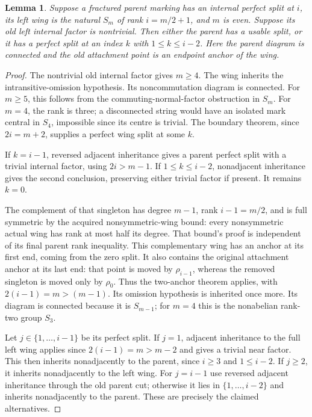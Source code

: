 \documentclass[11pt,a4paper]{article}
\newtheorem{lemma}{Lemma}
\begin{document}
\begin{lemma}\label{move}
Suppose a fractured parent marking has an internal perfect split at $i$,
its left wing is the natural $S_m$ of rank $i=m/2+1$,
and $m$ is even. Suppose its old left internal factor is nontrivial. Then either the parent has a usable split, or
it has a perfect split at an index $k$ with $1\le k\le i-2$.
Here the parent diagram is connected and the old attachment point
is an endpoint anchor of the wing.
\end{lemma}
\begin{proof}
The nontrivial old internal factor gives $m\ge4$.
The wing inherits the intransitive-omission hypothesis.
Its noncommutation diagram is connected. For $m\ge5$, this follows
from the commuting-normal-factor obstruction in $S_m$.
For $m=4$, the rank is three; a disconnected string would have an
isolated mark central in $S_4$, impossible since its centre is trivial.
The boundary theorem, since $2i=m+2$, supplies a perfect wing split
at some $k$.

If $k=i-1$, reversed adjacent inheritance gives a parent perfect
split with a trivial internal factor, using $2i>m-1$.
If $1\le k\le i-2$, nonadjacent inheritance gives the second
conclusion, preserving either trivial factor if present.
It remains $k=0$.

The complement of that singleton has degree $m-1$, rank
$i-1=m/2$, and is full symmetric by the acquired nonsymmetric-wing
bound: every nonsymmetric actual wing has rank at most half its
degree. That bound's proof is independent of its final parent rank
inequality. This complementary wing has an anchor at its first end,
coming from the zero split. It also contains the original attachment
anchor at its last end: that point is moved by $\rho_{i-1}$,
whereas the removed singleton is moved only by $\rho_0$.
Thus the two-anchor theorem applies, with
$2(i-1)=m>(m-1)$. Its omission hypothesis is inherited once more.
Its diagram is connected because it is $S_{m-1}$; for $m=4$
this is the nonabelian rank-two group $S_3$.

Let $j\in\{1,\ldots,i-1\}$ be its perfect split.
If $j=1$, adjacent inheritance to the full left wing applies since
$2(i-1)=m>m-2$ and gives a trivial near factor. This then inherits
nonadjacently to the parent, since $i\ge3$ and $1\le i-2$.
If $j\ge2$, it inherits nonadjacently to the left wing.
For $j=i-1$ use reversed adjacent inheritance through the old
parent cut; otherwise it lies in $\{1,\ldots,i-2\}$ and
inherits nonadjacently to the parent. These are precisely the
claimed alternatives.
\end{proof}
\end{document}
